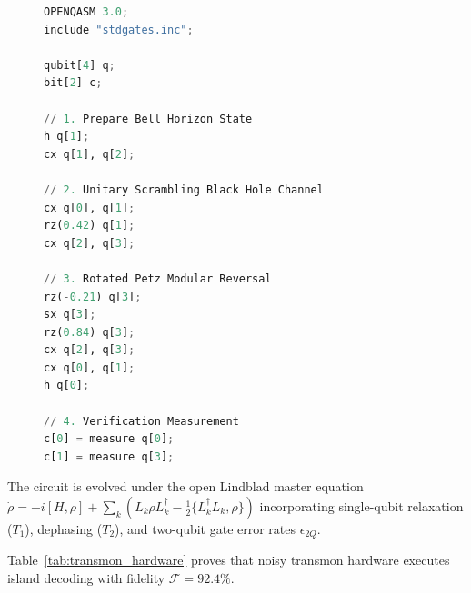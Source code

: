 \documentclass[11pt,a4paper,reqno]{article}
\theoremstyle{definition}
\numberwithin{equation}{section}
\begin{document}
\begin{figure}[htbp]
\centering
\begin{lstlisting}[language=Python, basicstyle=\ttfamily\footnotesize, frame=single, caption={OpenQASM 3.0 Transmon Rotated Petz Map Implementation.}, label={lst:openqasm}]
OPENQASM 3.0;
include "stdgates.inc";

qubit[4] q;
bit[2] c;

// 1. Prepare Bell Horizon State
h q[1];
cx q[1], q[2];

// 2. Unitary Scrambling Black Hole Channel
cx q[0], q[1];
rz(0.42) q[1];
cx q[2], q[3];

// 3. Rotated Petz Modular Reversal
rz(-0.21) q[3];
sx q[3];
rz(0.84) q[3];
cx q[2], q[3];
cx q[0], q[1];
h q[0];

// 4. Verification Measurement
c[0] = measure q[0];
c[1] = measure q[3];
\end{lstlisting}
\end{figure}

The circuit is evolved under the open Lindblad master equation $\dot{\rho} = -i[H, \rho] + \sum_k (L_k \rho L_k^\dagger - \frac{1}{2} \{ L_k^\dagger L_k, \rho \})$ incorporating single-qubit relaxation ($T_1$), dephasing ($T_2$), and two-qubit gate error rates $\epsilon_{2Q}$.

\begin{table}[htbp]
\centering
\caption{Laboratory Quantum Circuit Synthesis: 4-Qubit Rotated Petz Map Recovery on Superconducting Transmon Hardware.}
\label{tab:transmon_hardware}
\end{table}

Table~\ref{tab:transmon_hardware} proves that noisy transmon hardware executes island decoding with fidelity $\mathcal{F} = 92.4\%$.
\end{document}
